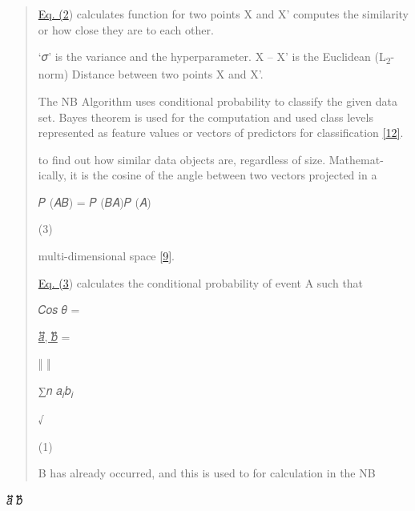 \documentclass[
]{article}
\begin{document}
\begin{quote}
\protect\hyperlink{_bookmark11}{Eq. (2}) calculates function for two
points X and X' computes the similarity or how close they are to each
other.

`𝜎' is the variance and the hyperparameter. \textbar\textbar X --
X'\textbar\textbar{} is the Euclidean (L\textsubscript{2}-norm) Distance
between two points X and X'.

The NB Algorithm uses conditional probability to classify the given data
set. Bayes theorem is used for the computation and used class levels
represented as feature values or vectors of predictors for classiﬁcation
\protect\hyperlink{_bookmark32}{{[}12{]}}.

\protect\hypertarget{_bookmark8}{}{}to ﬁnd out how similar data objects
are, regardless of size. Mathemat- ically, it is the cosine of the angle
between two vectors projected in a

𝑃 (𝐴\protect\hyperlink{_bookmark8}{\textbar{}}𝐵) = 𝑃 (𝐵\textbar 𝐴)𝑃 (𝐴)

(3)

multi-dimensional space \protect\hyperlink{_bookmark29}{{[}9{]}}.

\protect\hyperlink{_bookmark8}{Eq. (3}) calculates the conditional
probability of event A such that

\protect\hypertarget{_bookmark9}{}{}𝐶𝑜𝑠 𝜃 =

\uline{𝑎⃖⃗, 𝑏⃖⃗} =

‖ ‖

∑𝑛 𝑎\textsubscript{𝑖}𝑏\textsubscript{𝑖}

√

(1)

B has already occurred, and this is used to for calculation in the NB
\end{quote}

𝑎⃖⃗ 𝑏⃖⃗
\end{document}
